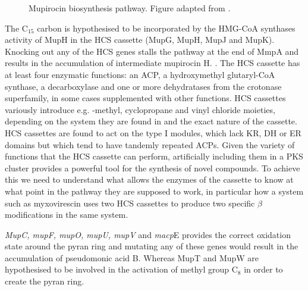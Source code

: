		\setlength\fboxsep{5pt}
		\setlength\fboxrule{1.5pt}
		\begin{figure} []
		\centering
		\caption[Mupirocin biosynthesis pathway]{Mupirocin biosynthesis pathway. Figure adapted from \parencite{Thomas2010}.}
		\label{fig:muppathway}
		\end{figure}
					
		The C$_{15} $ carbon is hypothesised to be incorporated by the HMG-CoA synthases activity of MupH in the HCS cassette (MupG, MupH, MupJ and MupK). Knocking out any of the HCS genes stalls the pathway at the end of MmpA and results in the accumulation of intermediate mupirocin H. \parencite{Wu2007}. The HCS cassette has at least four enzymatic functions: an ACP, a hydroxymethyl glutaryl-CoA synthase, a decarboxylase and one or more dehydratases from the crotonase superfamily, in some cases supplemented with other functions. HCS cassettes variously introduce e.g. \bet-methyl, cyclopropane and vinyl chloride moieties, depending on the system they are found in and the exact nature of the cassette. HCS cassettes are found to act on the type I modules, which lack KR, DH or ER domains but which  tend to have tandemly repeated ACPs. Given the variety of functions that the HCS cassette can perform, artificially including them in a PKS cluster provides a powerful tool for the synthesis of novel compounds. To achieve this we need to understand what allows the enzymes of the cassette to know at what point in the pathway they are supposed to work, in particular how a system such as myxovirescin uses two HCS cassettes to produce two specific $ \beta $ modifications in the same system.
		
		\textit{MupC, mupF, mupO, mupU, mupV} and \textit{macp}E provides the correct oxidation state around the pyran ring and mutating any of these genes would result in the accumulation of pseudomonic acid B. Whereas MupT and MupW are hypothesised to be involved in the activation of methyl group C$_{8} $  in order to create the pyran ring.
		
